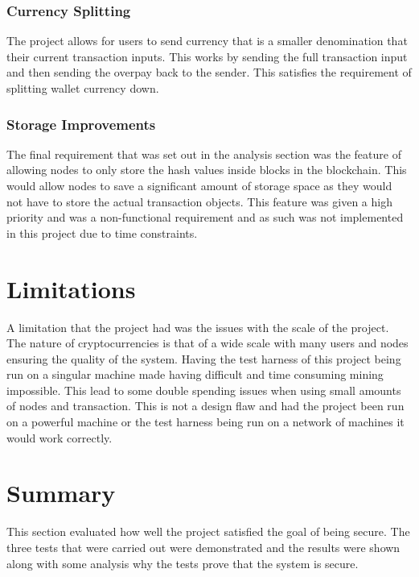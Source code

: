 \documentclass{l4proj}
\begin{document}
\subsubsection{Currency Splitting}
The project allows for users to send currency that is a smaller denomination that their current transaction inputs. This
works by sending the full transaction input and then sending the overpay back to the sender. This satisfies the 
requirement of splitting wallet currency down. 
\subsubsection{Storage Improvements}
The final requirement that was set out in the analysis section was the feature of allowing nodes to only store the
hash values inside blocks in the blockchain. This would allow nodes to save a significant amount of storage space as
they would not have to store the actual transaction objects. This feature was given a high priority and was a 
non-functional requirement and as such was not implemented in this project due to time constraints.

\section{Limitations}
A limitation that the project had was the issues with the scale of the project. The nature of cryptocurrencies is
that of a wide scale with many users and nodes ensuring the quality of the system. Having the test harness of this
project being run on a singular machine made having difficult and time consuming mining impossible. This lead to some
double spending issues when using small amounts of nodes and transaction. This is not a design flaw and had the project
been run on a powerful machine or the test harness being run on a network of machines it would work correctly.

\section{Summary}
This section evaluated how well the project satisfied the goal of being secure. The three tests that were carried out
were demonstrated and the results were shown along with some analysis why the tests prove that the system is secure.

\end{document}

